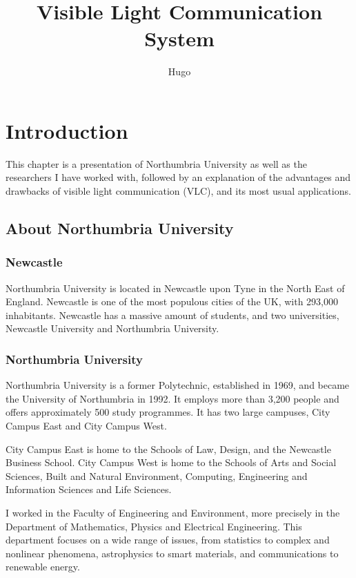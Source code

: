 \documentclass[12pt]{report}
\title{Visible Light Communication System}
\author{Hugo}
\begin{document}
\maketitle

\tableofcontents



\chapter{Introduction}

This chapter is a presentation of Northumbria University as well as the researchers I have worked with, followed by an explanation of the advantages and drawbacks of visible light communication (VLC), and its most usual applications.

\section{About Northumbria University}

\subsection{Newcastle}

Northumbria University is located in Newcastle upon Tyne in the North East of England. Newcastle is one of the most populous cities of the UK, with 293,000 inhabitants. Newcastle has a massive amount of students, and two universities, Newcastle University and Northumbria University.

\subsection{Northumbria University}

Northumbria University is a former Polytechnic, established in 1969, and became the University of Northumbria in 1992. It employs more than 3,200 people and offers approximately 500 study programmes. It has two large campuses, City Campus East and City Campus West.

City Campus East is home to the Schools of Law, Design, and the Newcastle Business School. City Campus West is home to the Schools of Arts and Social Sciences, Built and Natural Environment, Computing, Engineering and Information Sciences and Life Sciences.

I worked in the Faculty of Engineering and Environment, more precisely in the Department of Mathematics, Physics and Electrical Engineering. This department focuses on a wide range of issues, from statistics to complex and nonlinear phenomena, astrophysics to smart materials, and communications to renewable energy.
\end{document}
